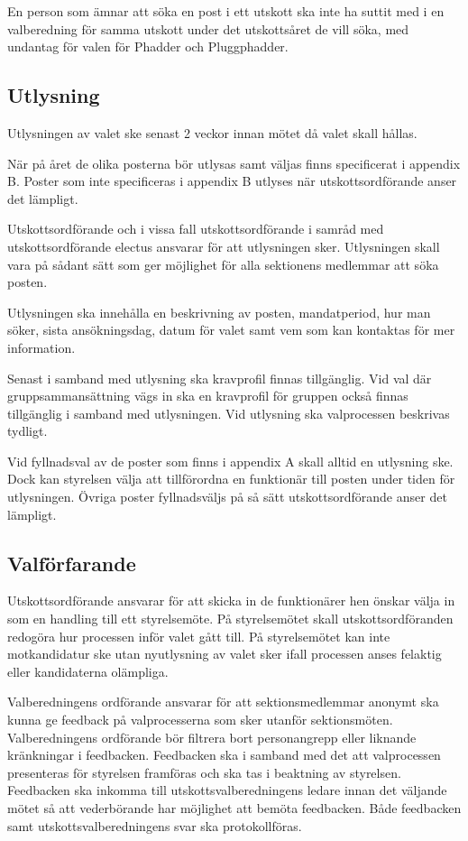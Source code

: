 \documentclass{dsekprotokoll}
\begin{document}
En person som ämnar att söka en post i ett utskott ska inte ha suttit med i en valberedning för samma utskott under det utskottsåret de vill söka, med undantag för valen för Phadder och Pluggphadder.

\subsection{Utlysning}
Utlysningen av valet ske senast 2 veckor innan mötet då valet skall hållas.

När på året de olika posterna bör utlysas samt väljas finns specificerat i appendix B. Poster som inte specificeras i appendix B utlyses när utskottsordförande anser det lämpligt.

Utskottsordförande och i vissa fall utskottsordförande i samråd med utskottsordförande electus ansvarar för att utlysningen sker. Utlysningen skall vara på sådant sätt som ger möjlighet för alla sektionens medlemmar att söka posten.

Utlysningen ska innehålla en beskrivning av posten, mandatperiod, hur man söker, sista ansökningsdag, datum för valet samt vem som kan kontaktas för mer information.

Senast i samband med utlysning ska kravprofil finnas tillgänglig. Vid val där gruppsammansättning vägs in ska en kravprofil för gruppen också finnas
tillgänglig i samband med utlysningen. Vid utlysning ska valprocessen beskrivas tydligt.

Vid fyllnadsval av de poster som finns i appendix A skall alltid en utlysning ske. Dock kan styrelsen välja att tillförordna en funktionär till posten under tiden för utlysningen. Övriga poster fyllnadsväljs på så sätt utskottsordförande anser det lämpligt.

\subsection{Valförfarande}
Utskottsordförande ansvarar för att skicka in de funktionärer hen önskar välja in som en handling till ett styrelsemöte. På styrelsemötet skall utskottsordföranden redogöra hur processen inför valet gått till. På styrelsemötet kan inte motkandidatur ske utan nyutlysning av valet sker ifall processen anses felaktig eller kandidaterna olämpliga.

Valberedningens ordförande ansvarar för att sektionsmedlemmar anonymt ska kunna ge
feedback på valprocesserna som sker utanför sektionsmöten. Valberedningens ordförande bör filtrera bort personangrepp eller liknande kränkningar i feedbacken. Feedbacken ska i samband
med det att valprocessen presenteras för styrelsen framföras och ska tas i beaktning av
styrelsen. Feedbacken ska inkomma till utskottsvalberedningens ledare innan det väljande mötet
så att vederbörande har möjlighet att bemöta feedbacken. Både feedbacken samt utskottsvalberedningens svar ska protokollföras.
\end{document}
